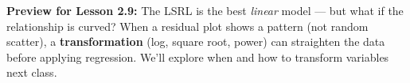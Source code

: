 \documentclass[10pt]{article}
\begin{document}
\vspace{0.16in}

\begin{tcolorbox}[colback=greenbg, colframe=greenacc, boxrule=0.8pt, arc=2mm,
    left=4mm, right=4mm, top=2.5mm, bottom=2.5mm]
\small\textbf{Preview for Lesson 2.9:} The LSRL is the best \emph{linear} model --- but what
if the relationship is curved? When a residual plot shows a pattern (not random scatter), a
\textbf{transformation} (log, square root, power) can straighten the data before applying
regression. We'll explore when and how to transform variables next class.
\end{tcolorbox}
\end{document}
